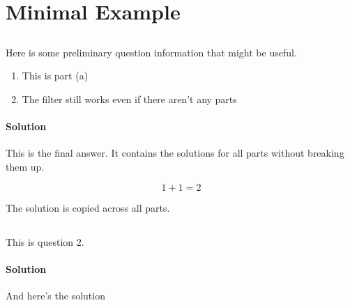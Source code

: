 \documentclass[12pt]{article}
\newenvironment{AnyName}{}{}
\begin{document}
\section{Minimal Example}

\subsection{}

Here is some preliminary question information that might be useful.

\begin{enumerate}
    \item This is part (a)
    \item The filter still works even if there aren't any parts
\end{enumerate}

\begin{AnyName}
    \paragraph{Solution}

    This is the final answer. It contains the solutions for all parts without breaking them up.

    $$
        1+1 = 2
    $$

    The solution is copied across all parts.

\end{AnyName}

\subsection{}

This is question 2.

\begin{AnyName}
    \paragraph{Solution} And here's the solution
\end{AnyName}
\end{document}
